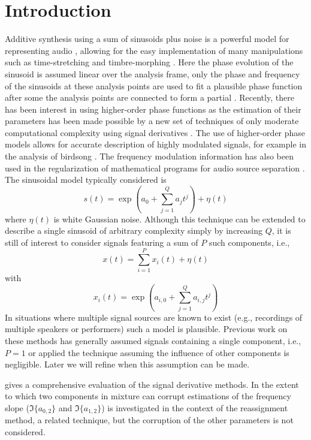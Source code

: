 \documentclass[twoside,a4paper]{article}
\begin{document}
\section{Introduction}
\label{sec:intro}
Additive synthesis using a sum of sinusoids plus noise is a powerful model for
representing audio \cite{serra1989system}, allowing for the easy implementation
of many manipulations such as time-stretching \cite{marchand2004enhanced} and
timbre-morphing \cite{haken2007beyond}.
%
Here the phase evolution of the sinusoid is assumed linear over
the analysis frame, only the phase and frequency of the sinusoids at these
analysis points are used to fit a plausible phase function after some
the analysis points are connected to form a partial
\cite{mcaulay1986speech}. 
%
Recently, there has
been interest in using higher-order phase functions \cite{xuepiecewise} as the estimation of
their parameters has been made possible by a new set of techniques of only
moderate computational complexity using signal derivatives \cite{hamilton2012unified}.
%
The use
of higher-order phase models allows for accurate description of highly modulated
signals, for
example in the analysis of birdsong \cite{stowell2013improved}.
%
The frequency
modulation information has also been used in the
regularization of mathematical programs for audio source separation \cite{creager2016musicalsource}.
%
The sinusoidal model typically considered is
%
\begin{equation}
    \label{eq:polyphaseexp}
    s(t) = \exp(a_0 + \sum_{j=1}^{Q} a_j t^j) + \eta(t)
\end{equation}
where $\eta(t)$ is white Gaussian noise.
%
Although this technique can be extended to describe a single
sinusoid of arbitrary complexity simply by increasing $Q$, it is still of
interest to consider signals featuring a sum of $P$ such components, i.e.,
%
\begin{equation}
    \label{eq:polyphaseexpmix}
    x(t) = \sum_{i=1}^{P} x_{i}(t) + \eta(t)
\end{equation}
%
with
%
\[
    x_{i}(t) = \exp(a_{i,0} + \sum_{j=1}^{Q} a_{i,j} t^j)
\]
%
In situations where multiple signal sources are known to exist (e.g., recordings
of multiple speakers or performers) such a model is plausible.
%
Previous work on these methods has generally assumed signals containing a single
component, i.e., $P=1$ or applied the technique assuming the influence of other
components is negligible. Later we will refine when this assumption can be made.

\cite{hamilton2012comparisons} gives a comprehensive evaluation of the signal
derivative methods. In \cite{robel2002estimating} the extent to which two
components in mixture can corrupt estimations of the frequency slope
($\Im\{a_{0,2}\}$ and $\Im\{a_{1,2}\}$) is investigated in the context of the
reassignment method, a related technique, but the corruption of the other
parameters is not considered.
\end{document}
